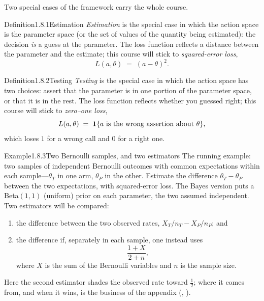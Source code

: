 \documentclass[main.tex]{subfiles}
\begin{document}

Two special cases of the framework carry the whole course. 

\begin{Obj}{Definition}{1.8.1}{Estimation}
\emph{Estimation} is the special case in which the action space is the parameter space (or the
set of values of the quantity being estimated): the decision \emph{is} a guess at the
parameter. The loss function reflects a distance between the parameter and the estimate; this
course will stick to \emph{squared-error loss},
\[ L(a,\theta) \;=\; (a-\theta)^2 . \]
\end{Obj}

\begin{Obj}{Definition}{1.8.2}{Testing}
\emph{Testing} is the special case in which the action space has two choices: assert that the
parameter is in one portion of the parameter space, or that it is in the rest. The loss
function reflects whether you guessed right; this course will stick to \emph{zero--one loss},
\[ L(a,\theta) \;=\; \mathbf{1}\{a \text{ is the wrong assertion about } \theta\} , \]
which loses $1$ for a wrong call and $0$ for a right one.
\end{Obj}

\begin{ObjL}{Example}{1.8.3}{Two Bernoulli samples, and two estimators}
The running example: two samples of independent Bernoulli outcomes with common expectations
within each sample---$\theta_T$ in one arm, $\theta_P$ in the other. Estimate the difference
$\theta_T-\theta_P$ between the two expectations, with squared-error loss. The Bayes version
puts a Beta$(1,1)$ (uniform) prior on each parameter, the two assumed independent. Two
estimators will be compared:
\begin{enumerate}[leftmargin=2.2em,itemsep=2pt,topsep=2pt]
  \item the difference between the two observed rates, $X_T/n_T - X_P/n_P$; and
  \item the difference if, separately in each sample, one instead uses
        \[ \frac{1+X}{2+n}, \]
        where $X$ is the sum of the Bernoulli variables and $n$ is the sample size.
\end{enumerate}
Here the second estimator shades the observed rate toward $\tfrac12$; where it comes from, and
when it wins, is the business of the appendix (, ).
\end{ObjL}
\end{document}
